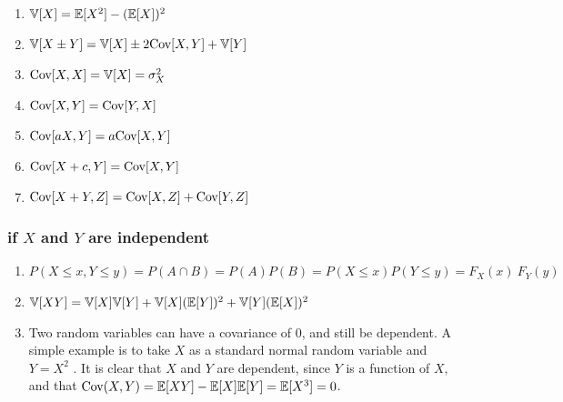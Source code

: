 \begin{multicols}{2}
\begin{enumerate}[resume*=calcrulesrv]
    \item $\mathbb{V}[X] = \mathbb{E}[X^2] - (\mathbb{E}[X])^2$
    \hfill \cite{statistics/book/Statistics-for-Data-Scientists/Maurits-Kaptein, mfml/book/mml/Deisenroth-Faisal-Ong}

    \item $\mathbb{V}[X \pm Y] = \mathbb{V}[X] \pm 2\text{Cov}[X, Y] + \mathbb{V}[Y]$
    \hfill \cite{statistics/book/Statistics-for-Data-Scientists/Maurits-Kaptein, mfml/book/mml/Deisenroth-Faisal-Ong}




    \item $\text{Cov}[X, X] = \mathbb{V}[X] = \sigma^2_X$
    \hfill \cite{statistics/book/Statistics-for-Data-Scientists/Maurits-Kaptein}

    \item $\text{Cov}[X, Y] = \text{Cov}[Y, X]$
    \hfill \cite{statistics/book/Statistics-for-Data-Scientists/Maurits-Kaptein}

    \item $\text{Cov}[aX, Y] = a\text{Cov}[X, Y]$
    \hfill \cite{statistics/book/Statistics-for-Data-Scientists/Maurits-Kaptein}

    \item $\text{Cov}[X + c, Y] = \text{Cov}[X, Y]$
    \hfill \cite{statistics/book/Statistics-for-Data-Scientists/Maurits-Kaptein}

    \item $\text{Cov}[X + Y, Z] = \text{Cov}[X, Z] + \text{Cov}[Y, Z]$
    \hfill \cite{statistics/book/Statistics-for-Data-Scientists/Maurits-Kaptein}
\end{enumerate}
\end{multicols}




\subsubsection{if $X$ and $Y$ are independent}



\begin{enumerate}[resume*=calcrulesrv]
    \item
    $
        P(X \leq x, Y \leq y)
        = P(A \cap B)
        = P(A) P(B)
        = P(X \leq x) P(Y \leq y)
        = F _X (x)\ F_Y (y)
    $
    \hfill \cite{statistics/book/Statistics-for-Data-Scientists/Maurits-Kaptein}

    \item
    $
        \mathbb{V}[X Y]
        = \mathbb{V}[X] \mathbb{V}[Y] + \mathbb{V}[X](\mathbb{E}[Y])^2 + \mathbb{V}[Y](\mathbb{E}[X])^2
    $
    \hfill \cite{statistics/book/Statistics-for-Data-Scientists/Maurits-Kaptein}

    \item Two random variables can have a covariance of $0$, and still be dependent.
    A simple example is to take $X$ as a standard normal random variable and $Y = X^2$ .
    It is clear that $X$ and $Y$ are dependent, since $Y$ is a function of $X$, and that $\text{Cov}(X, Y ) = \mathbb{E}[X Y] - \mathbb{E}[X] \mathbb{E}[Y] = \mathbb{E}[X^3] = 0$.
    \hfill \cite{statistics/book/Statistics-for-Data-Scientists/Maurits-Kaptein}
\end{enumerate}


